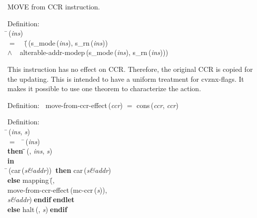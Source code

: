  MOVE from CCR instruction.
\begin{tabbing}{\sc Definition}: \\  
\=\,({\it{ins\/}}) \\ 
$=$$\;\;\;\;$(\=\,({\rm{s\_mode}}\,({\it{ins\/}}), {\rm{s\_rn}}\,({\it{ins\/}})) \\ 
$\wedge$$\;\;\;\;${\rm{alterable-addr-modep}}\,({\rm{s\_mode}}\,({\it{ins\/}}), {\rm{s\_rn}}\,({\it{ins\/}})))\-\-
\end{tabbing}

 This instruction has no effect on CCR. Therefore, the original CCR is
 copied for the updating.  This is intended to have a uniform treatment
 for cvznx-flags.  It makes it possible to use one theorem to characterize
 the action.
\begin{tabbing}{\sc Definition}:$\;\;$
{\rm{move-from-ccr-effect}}\,({\it{ccr\/}}) $=$ {\rm{cons}}\,({\it{ccr\/}}, {\it{ccr\/}})
\end{tabbing}

\begin{tabbing}{\sc Definition}: \\  
\=\,({\it{ins\/}}, {\it{s\/}}) \\ 
$=$$\;\;\;\;$\=\,({\it{ins\/}}) \\ 
{\bf then }\=\=\,({}, {\it{ins\/}}, {\it{s\/}})\- \\ 
{\bf in} \\ 
\=\,({\rm{car}}\,({\it{s\&addr\/}}))$\;\;${\bf then }{\rm{car}}\,({\it{s\&addr\/}}) \\ 
{\bf else }{\rm{mapping}}\,(\=, \\ 
{\rm{move-from-ccr-effect}}\,({\rm{mc-ccr}}\,({\it{s\/}})), \\ 
{\it{s\&addr\/}})\-$\;${\bf  endif}\-$\;${\bf  endlet}\- \\ 
{\bf else }{\rm{halt}}\,({}, {\it{s\/}})$\;${\bf  endif}\-\-
\end{tabbing}

